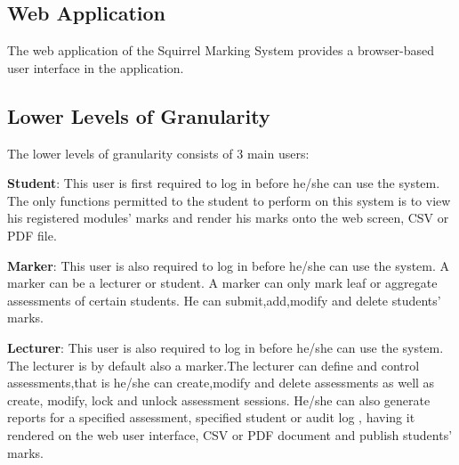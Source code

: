 \documentclass[a4paper]{article}
\begin{document}
\subsection{Web Application}
The web application of the Squirrel Marking System provides a browser-based user interface in the application.

\subsection*{Lower Levels of Granularity}
The lower levels of granularity consists of 3 main users:

\textbf{Student}: This user is first required to log in before he/she can use the system. The only functions  permitted to the student to perform on this system is to view his registered modules' 	marks and render his marks onto the web screen, CSV or PDF file.

\textbf{Marker}: This user is also required to log in before he/she can use the system. A marker can be a 	lecturer or student. A marker can only mark leaf or aggregate assessments of certain students. He can submit,add,modify and delete students' marks.

\textbf{Lecturer}: This user is also required to log in before he/she can use the system. The lecturer is by default also a marker.The lecturer can define and control assessments,that is he/she can   		create,modify and delete assessments as well as create, modify, lock and unlock assessment sessions. He/she can also generate reports for a specified assessment, specified student or audit log , having it rendered on the web user interface, CSV or PDF document and publish students' marks.
\end{document}
